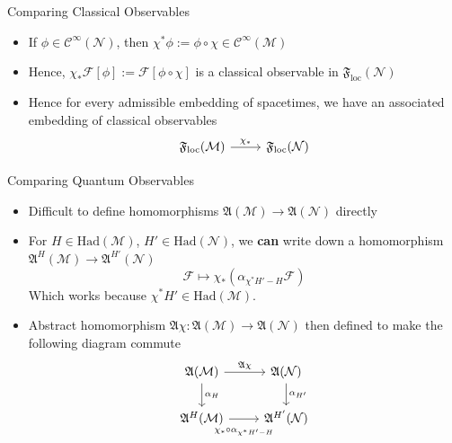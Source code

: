 \documentclass[pdf, fleqn, compress, handout]{beamer}
\begin{document}
\begin{frame}[fragile]{Comparing Classical Observables}
	\begin{itemize}
		\item	If $\phi \in \mathcal{C}^\infty(\mathcal{N})$, then
				$\chi^* \phi := \phi \circ \chi \in \mathcal{C}^\infty(\mathcal{M})$
		\item	Hence,
				$
					\chi_* \mathcal{F}[\phi]
						:=
					\mathcal{F}[\phi \circ \chi]	
				$
				is a classical observable in
				$\mathfrak{F}_\mathrm{loc}(\mathcal{N})$
		\item	Hence for every admissible embedding of spacetimes,
				we have an associated embedding of classical observables
		\begin{equation}
				\begin{tikzcd}
					\mathfrak{F}_\mathrm{loc}(\mathcal{M})
					\rar["\chi_*"] &
					\mathfrak{F}_\mathrm{loc}(\mathcal{N})
				\end{tikzcd}			
		\end{equation}
	\end{itemize}
\end{frame}

\begin{frame}[fragile]{Comparing Quantum Observables}
	\begin{itemize}
		\item	Difficult to define homomorphisms
				$\mathfrak{A}(\mathcal{M}) \to
				 \mathfrak{A}(\mathcal{N})$ directly
		\item	For
				$H  \in \mathrm{Had}(\mathcal{M})$,
				$H' \in \mathrm{Had}(\mathcal{N})$,
				we \textbf{can} write down a homomorphism
				$\mathfrak{A}^H(\mathcal{M}) \to \mathfrak{A}^{H'}(\mathcal{N})$
				\begin{equation}
					\mathcal{F}
						\mapsto
					\chi_* \left( \alpha_{\chi^* H' - H} \mathcal{F} \right)
				\end{equation}
				Which works because $\chi^* H' \in \mathrm{Had(\mathcal{M})}$.
		\item   Abstract homomorphism
				$
					\mathfrak{A}\chi:
					\mathfrak{A}(\mathcal{M})
						\to
					\mathfrak{A}(\mathcal{N})
				$
				then defined to make the following diagram commute
				\begin{equation}
					\begin{tikzcd}
						\mathfrak{A}(\mathcal{M})
							\ar[r, "\mathfrak{A}\chi"]
							\dar["\alpha_H"]	&
						\mathfrak{A}(\mathcal{N})
							\dar["\alpha_{H'}"]	\\
						\mathfrak{A}^H(\mathcal{M})
							\rar[
									swap,
									"\chi_* \circ \alpha_{\chi^* H' - H}",
									outer sep=5pt
								]	&
						\mathfrak{A}^{H'}(\mathcal{N})
					\end{tikzcd}
				\end{equation}
	\end{itemize}
\end{frame}
\end{document}
